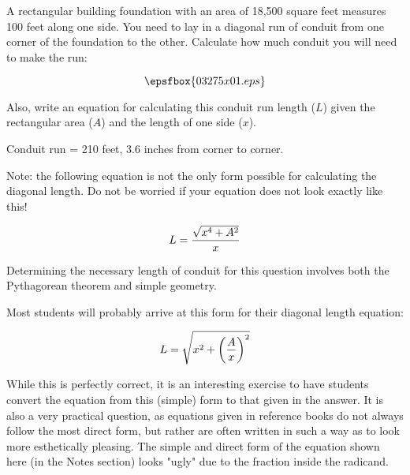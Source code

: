 

A rectangular building foundation with an area of 18,500 square feet measures 100 feet along one side.  You need to lay in a diagonal run of conduit from one corner of the foundation to the other.  Calculate how much conduit you will need to make the run:

$$\epsfbox{03275x01.eps}$$

Also, write an equation for calculating this conduit run length ($L$) given the rectangular area ($A$) and the length of one side ($x$).







Conduit run = 210 feet, 3.6 inches from corner to corner.

\vskip 10pt

Note: the following equation is not the only form possible for calculating the diagonal length.  Do not be worried if your equation does not look exactly like this!

$$L = {{\sqrt{x^4 + A^2}} \over x}$$







Determining the necessary length of conduit for this question involves both the Pythagorean theorem and simple geometry.

Most students will probably arrive at this form for their diagonal length equation:

$$L = \sqrt{x^2 + \left({A \over x}\right)^2}$$

While this is perfectly correct, it is an interesting exercise to have students convert the equation from this (simple) form to that given in the answer.  It is also a very practical question, as equations given in reference books do not always follow the most direct form, but rather are often written in such a way as to look more esthetically pleasing.  The simple and direct form of the equation shown here (in the Notes section) looks "ugly" due to the fraction inside the radicand.




